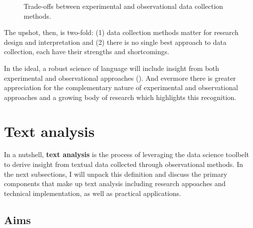 \documentclass[
  letterpaper,
  DIV=11,
  numbers=noendperiod]{scrreprt}
\theoremstyle{definition}
\theoremstyle{remark}
\begin{document}
\begin{figure}[H]


\caption{\label{fig-data-collection-methods}Trade-offs between
experimental and observational data collection methods.}

\end{figure}%

The upshot, then, is two-fold: (1) data collection methods matter for
research design and interpretation and (2) there is no single best
approach to data collection, each have their strengths and shortcomings.

In the ideal, a robust science of language will include insight from
both experimental and observational approaches
(). And evermore there
is greater appreciation for the complementary nature of experimental and
observational approaches and a growing body of research which highlights
this recognition.

\section{Text analysis}\label{text-analysis}

In a nutshell, \textbf{text analysis} is the
process of leveraging the data science toolbelt to derive insight from
textual data collected through observational methods. In the next
subsections, I will unpack this definition and discuss the primary
components that make up text analysis including research appoaches and
technical implementation, as well as practical applications.

\subsection{Aims}\label{aims}
\end{document}
